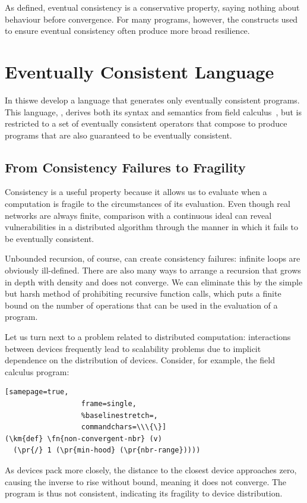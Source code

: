 \documentclass[12pt,a4paper,twoside,openright]{book}
\begin{document}
As defined, eventual consistency is a conservative property, saying nothing about behaviour before convergence.
%
For many programs, however, the constructs used to ensure eventual consistency often produce more broad resilience.

\section{Eventually Consistent Language}

In this\levelText{}we develop a language that generates only eventually consistent programs.
%
This language, \calculus{}, derives both its syntax and semantics from field calculus~\cite{VDB-FOCLASA-CIC2013}, but is restricted to a set of eventually consistent operators that compose to produce programs that are also guaranteed to be eventually consistent.

\subsection{From Consistency Failures to Fragility}

Consistency is a useful property because it allows us to evaluate when a computation is fragile to the circumstances of its evaluation.
%
Even though real networks are always finite, comparison with a continuous ideal can reveal vulnerabilities in a distributed algorithm through the manner in which it fails to be eventually consistent.

Unbounded recursion, of course, can create consistency failures: infinite loops are obviously ill-defined.  There are also many ways to arrange a recursion that grows in depth with density and does not converge.
%
We can eliminate this by the simple but harsh method of prohibiting recursive function calls, which puts a finite bound on the number of operations that can be used in the evaluation of a program.

Let us turn next to a problem related to distributed computation: interactions between devices frequently lead to scalability problems due to implicit dependence on the distribution of devices.
%
Consider, for example, the field calculus program:
\begin{samepage}
\begin{Verbatim}[samepage=true,
                  frame=single,
                  %baselinestretch=,
                  commandchars=\\\{\}]
(\km{def} \fn{non-convergent-nbr} (v)
  (\pr{/} 1 (\pr{min-hood} (\pr{nbr-range}))))
\end{Verbatim}
\end{samepage}
As devices pack more closely, the distance to the closest device approaches zero, causing the inverse to rise without bound, meaning it does not converge.  The program is thus not consistent, indicating its fragility to device distribution.
\end{document}

